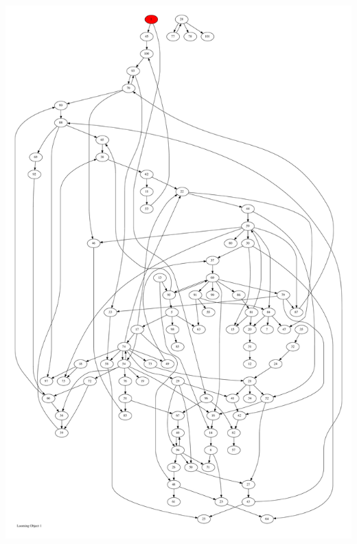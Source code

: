 \documentclass{article}
\begin{document}
\newpage
\includegraphics[max height=\textheight,max width=\textwidth]{looming_object/loom_obj1_pp.pdf}
\end{document}
